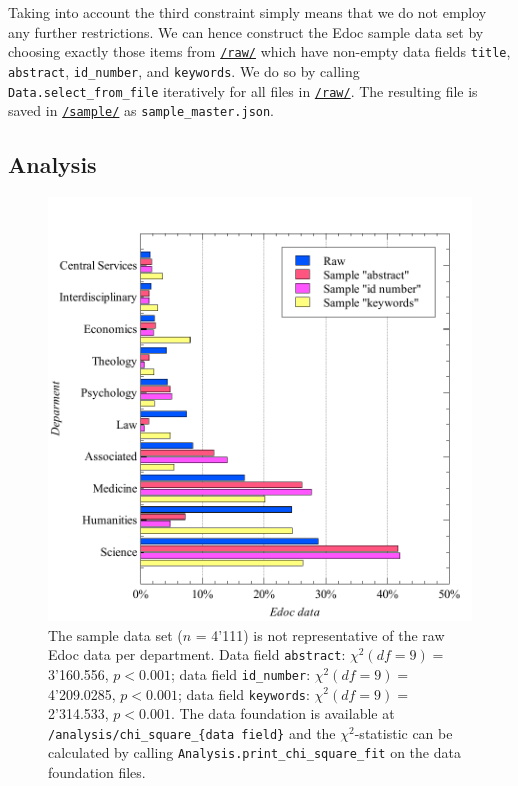 Taking into account the third constraint simply means that we do not
employ any further restrictions. We can hence construct the Edoc sample
data set by choosing exactly those items from
\href{https://github.com/MHindermann/mas/tree/main/files/raw}{\texttt{/raw/}}
which have non-empty data fields \texttt{title}, \texttt{abstract},
\texttt{id\_number}, and \texttt{keywords}. We do so by calling
\texttt{Data.select\_from\_file} iteratively for all files in
\href{https://github.com/MHindermann/mas/tree/main/files/raw}{\texttt{/raw/}}.
The resulting file is saved in
\href{https://github.com/MHindermann/mas/tree/main/files/sample}{\texttt{/sample/}}
as \texttt{sample\_master.json}.

\hypertarget{analysis}{%
\subsection{Analysis}\label{analysis}}

\begin{figure}
\centering
\includegraphics{images/chi_square_selection_fields.pdf}
\caption{The sample data set (\(n\) = 4'111) is not representative of
the raw Edoc data per department. Data field \texttt{abstract}:
\(\chi^2 (df=9) =\) 3'160.556, \(p < 0.001\); data field
\texttt{id\_number}: \(\chi^2 (df=9) =\) 4'209.0285, \(p < 0.001\); data
field \texttt{keywords}: \(\chi^2 (df=9) =\) 2'314.533, \(p < 0.001\).
The data foundation is available at
\texttt{/analysis/chi\_square\_\{data\ field\}} and the
\(\chi^2\)-statistic can be calculated by calling
\texttt{Analysis.print\_chi\_square\_fit} on the data foundation files.}
\end{figure}

